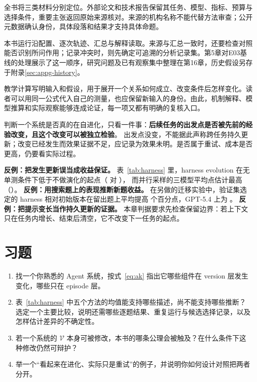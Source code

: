 全书将三类材料分别定位。外部论文和技术报告保留其任务、模型、指标、预算与选择条件，重要主张返回原始来源核对。来源的机构名称不能代替方法审查；公开元数据确认身份，具体段落和结果才支持具体命题。

本书运行沿配置、逐次轨迹、汇总与解释读取。来源与汇总一致时，还要检查对照能否识别所问作用；记录冲突时，则先确定可追溯的分析记录集。第5章对E03基线的处理展示了这一顺序，研究问题及已有观察集中整理在第16章，历史假设另存于附录\ref{sec:appg-history}。

教学计算写明输入和假设，用于展开一个关系如何成立、改变条件后怎样变化。读者可以用同一公式代入自己的测量，也应保留新输入的身份。由此，机制解释、模型推算和实际观察能够连成论证，每一项又都有明确的复核入口。

\begin{principlebox}
判断一个系统是否真的在自进化，只看一件事：\textbf{后续任务的出发点是否被先前的经验改变，且这个改变可以被独立检验}。
出发点没变，不能据此声称跨任务持久更新；改变已经发生而效果证据不足，应记录为效果未明。是否属于重试、成本是否更高，仍要看实际过程。
\end{principlebox}

\begin{pitfallbox}
\textbf{反例：把发生更新误当成收益保证。}
表~\ref{tab:harness} 里，harness evolution 在无单测条件下低于不做演化的起点（ 对 ），
而并行采样的三模型平均点估计最高（）。
\textbf{反例：用搜索题上的表现推断新题收益。}
在另做的迁移实验中，验证集选定的 harness 相对初始版本在留出题上平均提高  个百分点，GPT-5.4 上为 。
\textbf{反例：把提示变长当作持久更新的证据。}
本章判据要求先检查保留边界：若上下文只在任务内增长、结束后清空，它不改变下一任务的起点。
\end{pitfallbox}

\section*{习题}
\begin{enumerate}[label=1-\arabic*.,ref=1-\arabic*]
  \item\label{ex:ch01-1} 找一个你熟悉的 Agent 系统，按式~\eqref{eq:ak} 指出它哪些组件在 version 层发生变化，哪些只在 episode 层。
  \item\label{ex:ch01-2} 表~\ref{tab:harness} 中五个方法的均值能支持哪些描述，尚不能支持哪些推断？选定一个主要比较，说明还需哪些逐题结果、重复运行与候选选择记录，以及怎样估计差异的不确定性。
  \item\label{ex:ch01-3} 若一个系统的 $\mathcal V$ 本身可被修改，本书的哪条公理会被触及？在什么条件下这种修改仍然可辩护？
  \item\label{ex:ch01-4} 举一个“看起来在进化、实际只是重试”的例子，并说明你如何设计对照把两者分开。
\end{enumerate}

